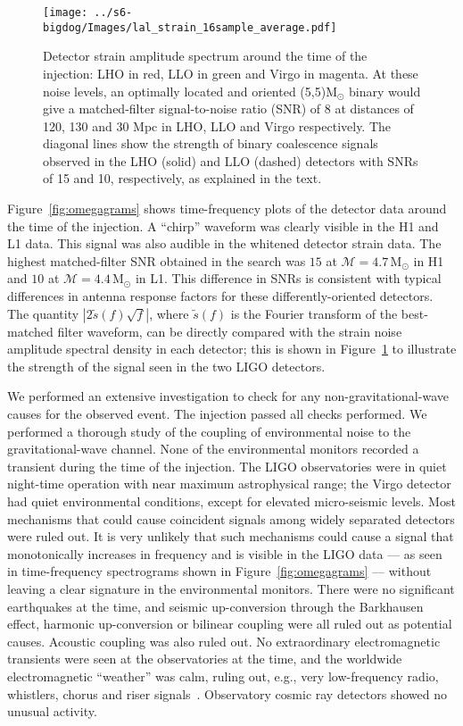 \documentclass[prd,superscriptaddress,showpacs,amssymb,amsmath,amsfonts,aps,altaffilletter,nofootinbib,letterpaper,twocolumn]{revtex4}
\def\Msun{\ensuremath{\mathrm{M_{\odot}}}}
\begin{document}
\begin{figure}[t]
\texttt{[image: ../s6-bigdog/Images/lal\_strain\_16sample\_average.pdf]}
\caption{Detector strain amplitude spectrum around the time of the injection:
\ac{LHO} in red, \ac{LLO} in green and Virgo in magenta.  At these noise
levels, an optimally located and oriented (5,5)$\Msun$ binary would give a
matched-filter signal-to-noise ratio (SNR) of 8 at distances of 120, 130 and 30
Mpc in LHO, LLO and Virgo respectively.  The diagonal lines show the strength
of binary coalescence signals observed in the LHO (solid) and LLO (dashed)
detectors with SNRs of 15 and 10, respectively, as explained in the text.
\label{f:noise_curve}}
\end{figure}

Figure~\ref{fig:omegagrams} shows time-frequency plots of the detector data
around the time of the injection. A ``chirp'' waveform was clearly visible in
the H1 and L1 data. This signal was also audible in the whitened detector
strain data. The highest matched-filter SNR obtained in the search was $15$ at
$\mathcal{M} = 4.7\,\Msun$ in H1 and $10$ at $\mathcal{M} = 4.4\,\Msun$ in L1.
This difference in SNRs is consistent with typical differences in antenna
response factors for these differently-oriented detectors.  The quantity
$|2\tilde{s}(f)\sqrt{f}|$, where $\tilde{s}(f)$ is the Fourier transform of the
best-matched filter waveform, can be directly compared with the strain noise
amplitude spectral density in each detector; this is shown in
Figure~\ref{f:noise_curve} to illustrate the strength of the signal seen in the
two LIGO detectors.

We performed an extensive investigation to check for any
non-gravitational-wave causes for the observed event. The injection
passed all checks performed. We performed a thorough study of the
coupling of environmental noise to the gravitational-wave channel. None
of the environmental monitors recorded a transient during the time of
the injection.  The LIGO observatories were in quiet night-time
operation with near maximum astrophysical range; the Virgo detector
had quiet environmental conditions, except for elevated micro-seismic
levels. Most mechanisms that could cause coincident signals among widely
separated detectors were ruled out. It is very unlikely that such mechanisms could
cause a signal that monotonically increases in frequency and is visible
in the LIGO data --- as seen in time-frequency spectrograms shown in
Figure~\ref{fig:omegagrams} --- without leaving a clear signature in the
environmental monitors. There were no significant earthquakes at the
time, and seismic up-conversion through the Barkhausen effect, harmonic
up-conversion or bilinear coupling were all ruled out as potential
causes. Acoustic coupling was also ruled out. No extraordinary
electromagnetic transients were seen at the observatories at the time,
and the worldwide electromagnetic ``weather'' was calm, ruling out, e.g.,
very low-frequency radio, whistlers, chorus and riser
signals~\cite{Singh:2004}.  Observatory cosmic ray detectors showed no
unusual activity.
\end{document}
